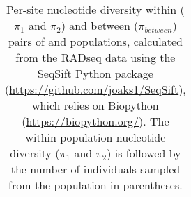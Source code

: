 \begin{table}[htbp]
\sffamily
\small
\captionsetup{name=Table S, labelformat=noSpace}
\caption{
    Per-site nucleotide diversity within ($\pi_1$ and $\pi_2$) and between
    ($\pi_{between}$) pairs of  and  populations,
    calculated from the RADseq data using the SeqSift Python package
    (\url{https://github.com/joaks1/SeqSift}),
    which relies on Biopython
    (\url{https://biopython.org/}).
    The within-population nucleotide diversity ($\pi_1$ and $\pi_2$) is
    followed by the number of individuals sampled from the population in
    parentheses.
}
\centering
\begin{tabular}{ l l l l l l }

\end{tabular}
\label{table:comparisondiversity}
\end{table}
